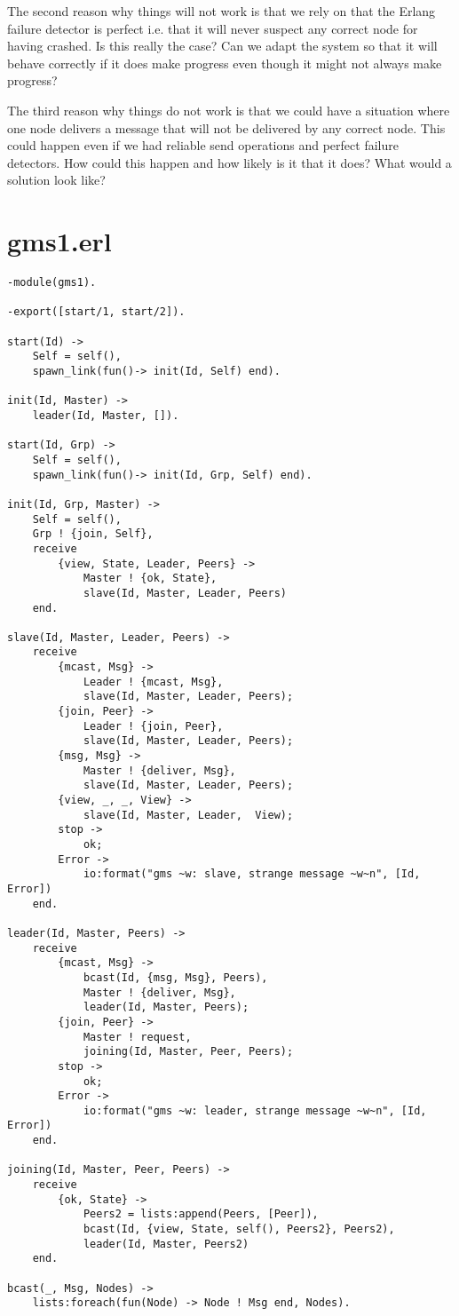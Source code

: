 \documentclass[a4paper,11pt]{article}
\newcommand{\nnsection}[1]{
\section*{#1}
\addcontentsline{toc}{section}{#1}
}
\begin{document}
The second reason why things will not work is that we rely on that the
Erlang failure detector is perfect i.e. that it will never suspect any
correct node for having crashed. Is this really the case? Can we adapt
the system so that it will behave correctly if it does make progress
even though it might not always make progress?

The third reason why things do not work is that we could have a
situation where one node delivers a message that will not be delivered
by any correct node. This could happen even if we had reliable send
operations and perfect failure detectors.  How could this happen and
how likely is it that it does?  What would a solution look like?


\pagebreak
\nnsection{gms1.erl}
\begin{verbatim}
-module(gms1).

-export([start/1, start/2]).

start(Id) ->
    Self = self(),
    spawn_link(fun()-> init(Id, Self) end).

init(Id, Master) ->
    leader(Id, Master, []).

start(Id, Grp) ->
    Self = self(),
    spawn_link(fun()-> init(Id, Grp, Self) end).    

init(Id, Grp, Master) ->
    Self = self(), 
    Grp ! {join, Self},
    receive
        {view, State, Leader, Peers} ->
            Master ! {ok, State},
            slave(Id, Master, Leader, Peers)
    end.

slave(Id, Master, Leader, Peers) ->    
    receive
        {mcast, Msg} ->
            Leader ! {mcast, Msg},
            slave(Id, Master, Leader, Peers);
        {join, Peer} ->
            Leader ! {join, Peer},
            slave(Id, Master, Leader, Peers);
        {msg, Msg} ->
            Master ! {deliver, Msg},
            slave(Id, Master, Leader, Peers);
        {view, _, _, View} ->
            slave(Id, Master, Leader,  View);       
        stop ->
            ok;
        Error ->
            io:format("gms ~w: slave, strange message ~w~n", [Id, Error])
    end.

leader(Id, Master, Peers) ->    
    receive
        {mcast, Msg} ->
            bcast(Id, {msg, Msg}, Peers),
            Master ! {deliver, Msg},
            leader(Id, Master, Peers);
        {join, Peer} ->
            Master ! request,
            joining(Id, Master, Peer, Peers);
        stop ->
            ok;
        Error ->
            io:format("gms ~w: leader, strange message ~w~n", [Id, Error])
    end.

joining(Id, Master, Peer, Peers) ->
    receive 
        {ok, State} ->
            Peers2 = lists:append(Peers, [Peer]),           
            bcast(Id, {view, State, self(), Peers2}, Peers2),
            leader(Id, Master, Peers2)
    end.

bcast(_, Msg, Nodes) ->
    lists:foreach(fun(Node) -> Node ! Msg end, Nodes).
\end{verbatim}
\end{document}
